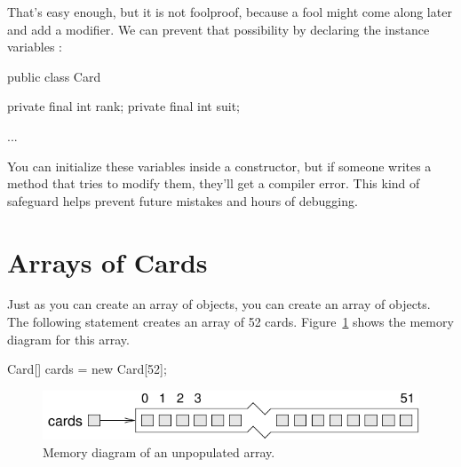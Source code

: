 
That's easy enough, but it is not foolproof, because a fool might come along later and add a modifier.
We can prevent that possibility by declaring the instance variables :

\begin{code}
public class Card {
    private final int rank;
    private final int suit;

    ...
}
\end{code}

You can initialize these variables inside a constructor,
but if someone writes a method that tries to modify them, they'll get a compiler error.
This kind of safeguard helps prevent future mistakes and hours of debugging.


\section{Arrays of Cards}
\label{cardarray}





Just as you can create an array of  objects, you can create an array of  objects.
The following statement creates an array of 52 cards.
Figure~\ref{fig.cardarray} shows the memory diagram for this array.

\begin{code}
Card[] cards = new Card[52];
\end{code}

\begin{figure}[!ht]
\begin{center}
\includegraphics{figs/cardarray.pdf}
\caption{Memory diagram of an unpopulated  array.}
\label{fig.cardarray}
\end{center}
\end{figure}

